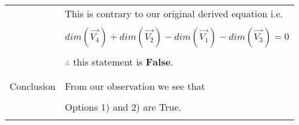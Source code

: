 \documentclass[journal,12pt]{IEEEtran}
\begin{document}
\begin{longtable}{|l|l|}
		& This is contrary to our original derived equation i.e. \\
		& \\
		& \qquad \qquad $dim(\vec{V_4}) + dim(\vec{V_2}) - dim(\vec{V_1}) - dim(\vec{V_3}) = 0$ \\
		& \\
		& $\therefore$ this statement is $\mathbf{False}$. \\
		&\\
		\hline
		\multirow{3}{*}{Conclusion} & \\
		& From our observation we see that \\
		&\\
		& Options 1) and 2) are True.\\
		& \\
		\hline
	\end{longtable}
\end{document}
